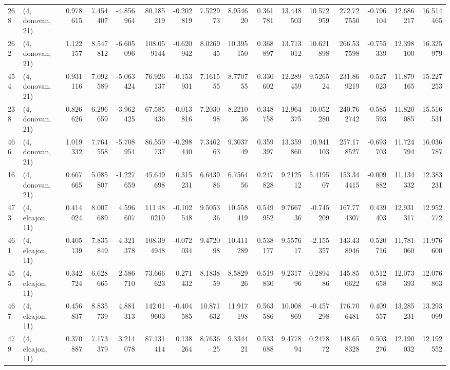 \begin{tabular}{llrrrrrrrrrrrrrr}
268 &  (4, donovan, 21) &   0.978615 &   7.454407 &  -4.856964 &    80.185219 &  -0.202819 &   7.522973 &   8.954620 &  0.361781 &  13.448503 &  10.572959 &   272.727550 &  -0.796104 &  12.686217 &  16.514465 \\
262 &  (4, donovan, 21) &   1.122157 &   8.547812 &  -6.605096 &   108.059144 &  -0.620942 &   8.026945 &  10.395150 &  0.368897 &  13.713012 &  10.621898 &   266.537598 &  -0.755339 &  12.398100 &  16.325979 \\
454 &  (4, donovan, 21) &   0.931116 &   7.092589 &  -5.063424 &    76.926137 &  -0.153931 &   7.161555 &   8.770755 &  0.330602 &  12.289459 &   9.526524 &   231.869219 &  -0.527023 &  11.879165 &  15.227253 \\
238 &  (4, donovan, 21) &   0.826626 &   6.296659 &  -3.962425 &    67.585436 &  -0.013816 &   7.203098 &   8.221036 &  0.348758 &  12.964375 &  10.052280 &   240.762742 &  -0.585593 &  11.820085 &  15.516531 \\
466 &  (4, donovan, 21) &   1.019332 &   7.764558 &  -5.708954 &    86.559737 &  -0.298440 &   7.346263 &   9.303749 &  0.359397 &  13.359860 &  10.941103 &   257.178527 &  -0.693703 &  11.724794 &  16.036787 \\
16  &  (4, donovan, 21) &   0.667665 &   5.085807 &  -1.227659 &    45.649698 &   0.315231 &   6.643986 &   6.756456 &  0.247828 &   9.212512 &   5.419507 &   153.344415 &  -0.009882 &  11.134332 &  12.383231 \\
473 &  (4, elcajon, 11) &   0.414024 &   8.007689 &   4.596607 &   111.480210 &  -0.102548 &   9.505336 &  10.558419 &  0.549952 &   9.766736 &  -0.745209 &   167.774307 &   0.439403 &  12.931317 &  12.952772 \\
461 &  (4, elcajon, 11) &   0.405139 &   7.835849 &   4.321378 &   108.394948 &  -0.072034 &   9.472098 &  10.411289 &  0.538177 &   9.557617 &  -2.155357 &   143.438946 &   0.520716 &  11.781060 &  11.976600 \\
455 &  (4, elcajon, 11) &   0.342724 &   6.628665 &   2.586710 &    73.666623 &   0.271432 &   8.183859 &   8.582926 &  0.519830 &   9.231796 &   0.289486 &   145.850622 &   0.512658 &  12.073393 &  12.076863 \\
467 &  (4, elcajon, 11) &   0.456837 &   8.835739 &   4.881313 &   142.019603 &  -0.404585 &  10.871632 &  11.917198 &  0.563586 &  10.008869 &  -0.457298 &   176.706481 &   0.409557 &  13.285231 &  13.293099 \\
479 &  (4, elcajon, 11) &   0.370887 &   7.173379 &   3.214078 &    87.131414 &   0.138264 &   8.763625 &   9.334421 &  0.533688 &   9.477894 &   0.247872 &   148.658328 &   0.503276 &  12.190032 &  12.192552 \\

\end{tabular}
